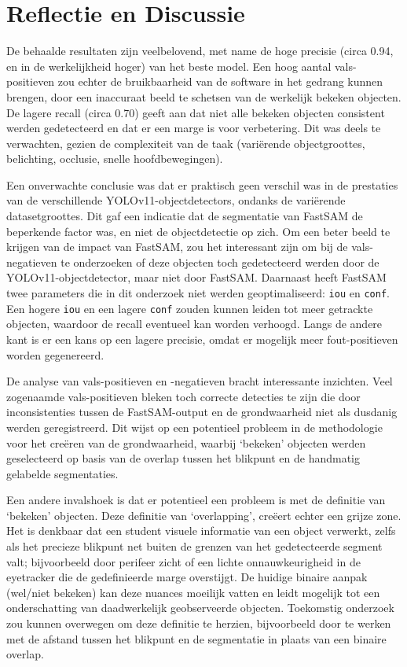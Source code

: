 \section{Reflectie en Discussie}

De behaalde resultaten zijn veelbelovend, met name de hoge precisie (circa 0.94, en in de werkelijkheid hoger) van het beste model. 
Een hoog aantal vals-positieven zou echter de bruikbaarheid van de software in het gedrang kunnen brengen, door 
een inaccuraat beeld te schetsen van de werkelijk bekeken objecten.
De lagere recall (circa 0.70) geeft aan dat niet alle bekeken objecten consistent werden gedetecteerd en dat er een marge is voor verbetering.
Dit was deels te verwachten, gezien de complexiteit van de taak (variërende objectgroottes, belichting, occlusie, snelle hoofdbewegingen).

Een onverwachte conclusie was dat er praktisch geen verschil was in de prestaties van de verschillende YOLOv11-objectdetectors,
ondanks de variërende datasetgroottes.
Dit gaf een indicatie dat de segmentatie van FastSAM de beperkende factor was,
en niet de objectdetectie op zich.
Om een beter beeld te krijgen van de impact van FastSAM, 
zou het interessant zijn om bij de vals-negatieven te onderzoeken of deze objecten toch gedetecteerd werden door de YOLOv11-objectdetector, 
maar niet door FastSAM.
Daarnaast heeft FastSAM twee parameters die in dit onderzoek niet werden geoptimaliseerd: 
\texttt{iou} en \texttt{conf}.
Een hogere \texttt{iou} en een lagere \texttt{conf} zouden kunnen leiden tot meer getrackte objecten, waardoor de recall eventueel kan worden verhoogd.
Langs de andere kant is er een kans op een lagere precisie, omdat er mogelijk meer fout-positieven worden gegenereerd.

De analyse van vals-positieven en -negatieven bracht interessante inzichten. 
Veel zogenaamde vals-positieven bleken toch correcte detecties te zijn die door inconsistenties 
tussen de FastSAM-output en de grondwaarheid niet als dusdanig werden geregistreerd. 
Dit wijst op een potentieel probleem in de methodologie voor het creëren van de grondwaarheid,
waarbij `bekeken' objecten werden geselecteerd op basis van de overlap tussen het blikpunt en de handmatig gelabelde segmentaties.

Een andere invalshoek is dat er potentieel een probleem is met de definitie van `bekeken' objecten.
Deze definitie van `overlapping', creëert echter een grijze zone.
Het is denkbaar dat een student visuele informatie van een object verwerkt, zelfs als het precieze blikpunt 
net buiten de grenzen van het gedetecteerde segment valt; bijvoorbeeld door perifeer zicht of een lichte 
onnauwkeurigheid in de eyetracker die de gedefinieerde marge overstijgt.
De huidige binaire aanpak (wel/niet bekeken) 
kan deze nuances moeilijk vatten en leidt mogelijk tot een onderschatting van daadwerkelijk geobserveerde objecten.
Toekomstig onderzoek zou kunnen overwegen om deze definitie te herzien,
bijvoorbeeld door te werken met de afstand tussen het blikpunt en de segmentatie in plaats van een binaire overlap.

